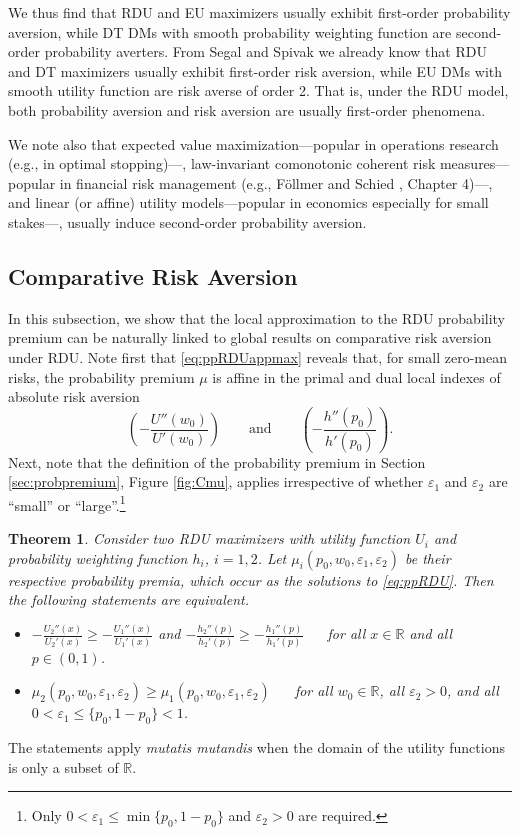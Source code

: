 \documentclass[11pt]{article}
\newtheorem{theorem}{Theorem}[section]
\begin{document}
We thus find that RDU and EU maximizers usually exhibit first-order probability aversion,
while DT DMs with smooth probability weighting function are second-order probability averters.
From Segal and Spivak \cite{SS90} we already know that RDU and DT maximizers usually exhibit first-order risk aversion,
while EU DMs with smooth utility function are risk averse of order 2.
That is, under the RDU model,
both probability aversion and risk aversion are usually first-order phenomena.

We note also that expected value maximization---popular in operations research (e.g., in optimal stopping)---,
law-invariant comonotonic coherent risk measures---popular in financial risk management (e.g., F\"ollmer and Schied \cite{FS11}, Chapter 4)---,
and linear (or affine) utility models---popular in economics especially for small stakes---,
usually induce second-order probability aversion.

\subsection{Comparative Risk Aversion}\label{sec:cra}

In this subsection, we show that the local approximation to the RDU probability premium can be naturally linked
to global results on comparative risk aversion under RDU.
Note first that \eqref{eq:ppRDUappmax} reveals that, for small zero-mean risks,
the probability premium $\mu$ is affine in the primal and dual local indexes of absolute risk aversion
\begin{equation*}
\left(-\frac{U''(w_{0})}{U'(w_{0})}\right)\qquad\mathrm{and}\qquad\left(-\frac{h''(p_{0})}{h'(p_{0})}\right).
\end{equation*}
Next, note that the definition of the probability premium in Section \ref{sec:probpremium}, Figure \ref{fig:Cmu},
applies irrespective of whether $\varepsilon_{1}$ and $\varepsilon_{2}$ are ``small'' or ``large''.\footnote{Only
$0<\varepsilon_{1}\leq \min\{p_{0},1-p_{0}\}$ and $\varepsilon_{2}>0$ are required.}

\begin{theorem}
Consider two RDU maximizers with utility function $U_{i}$ and probability weighting function $h_{i}$, $i=1,2$.
Let $\mu_{i}\left(p_{0},w_{0},\varepsilon_{1},\varepsilon_{2}\right)$ be their respective probability premia,
which occur as the solutions to \eqref{eq:ppRDU}.
Then the following statements are equivalent.
\begin{itemize}
\item[(i)] $-\frac{U_{2}''(x)}{U_{2}'(x)}\geq -\frac{U_{1}''(x)}{U_{1}'(x)}$ and $-\frac{h_{2}''(p)}{h_{2}'(p)}\geq -\frac{h_{1}''(p)}{h_{1}'(p)}$
$\quad$ for all $x\in\mathbb{R}$ and all $p\in(0,1)$.
\item[(ii)] $\mu_{2}(p_{0},w_{0},\varepsilon_{1},\varepsilon_{2})\geq \mu_{1}(p_{0},w_{0},\varepsilon_{1},\varepsilon_{2})$
$\quad$ for all $w_{0}\in\mathbb{R}$, all $\varepsilon_{2}>0$, and all $0<\varepsilon_{1}\leq\{p_{0},1-p_{0}\}<1$.
\end{itemize}
\label{th:cra}
\end{theorem}
The statements apply \textit{mutatis mutandis} when the domain of the utility functions is only a subset of $\mathbb{R}$.
\end{document}
